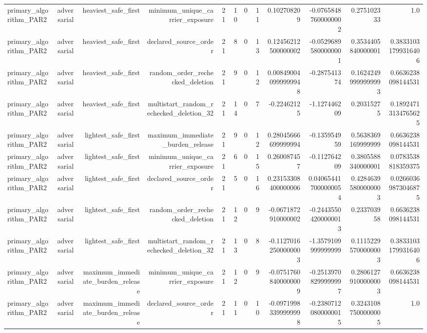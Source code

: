 {\begin{longtable}{lrrrrrrrrrrr}
primary\_algorithm\_PAR2 & adversarial & heaviest\_safe\_first & minimum\_unique\_carrier\_exposure & 21 & 10 & 0 & 11 & 0.102708209 & -0.07658487600000002 & 0.275102333 & 1.0 \\
primary\_algorithm\_PAR2 & adversarial & heaviest\_safe\_first & declared\_source\_order & 21 & 8 & 0 & 13 & 0.12456212500000002 & -0.05296895800000001 & 0.3534405840000001 & 0.38331031799316406 \\
primary\_algorithm\_PAR2 & adversarial & heaviest\_safe\_first & random\_order\_rechecked\_deletion & 21 & 9 & 0 & 12 & 0.008490040999999948 & -0.287541374 & 0.16242499999999993 & 0.6636238098144531 \\
primary\_algorithm\_PAR2 & adversarial & heaviest\_safe\_first & multistart\_random\_rechecked\_deletion\_32 & 21 & 14 & 0 & 7 & -0.22462125 & -1.127446209 & 0.20315275 & 0.18924713134765625 \\
primary\_algorithm\_PAR2 & adversarial & lightest\_safe\_first & maximum\_immediate\_burden\_release & 21 & 9 & 0 & 12 & 0.28045666699999994 & -0.135954959 & 0.5638369169999999 & 0.6636238098144531 \\
primary\_algorithm\_PAR2 & adversarial & lightest\_safe\_first & minimum\_unique\_carrier\_exposure & 21 & 6 & 0 & 15 & 0.260087457 & -0.112764209 & 0.3805588340000001 & 0.0783538818359375 \\
primary\_algorithm\_PAR2 & adversarial & lightest\_safe\_first & declared\_source\_order & 21 & 5 & 0 & 16 & 0.23153308400000006 & 0.040654417000000054 & 0.42846395800000003 & 0.02660369873046875 \\
primary\_algorithm\_PAR2 & adversarial & lightest\_safe\_first & random\_order\_rechecked\_deletion & 21 & 12 & 0 & 9 & -0.0671872910000002 & -0.24435504200000013 & 0.233703958 & 0.6636238098144531 \\
primary\_algorithm\_PAR2 & adversarial & lightest\_safe\_first & multistart\_random\_rechecked\_deletion\_32 & 21 & 13 & 0 & 8 & -0.11270162500000003 & -1.3579109999999999 & 0.11152295700000003 & 0.38331031799316406 \\
primary\_algorithm\_PAR2 & adversarial & maximum\_immediate\_burden\_release & minimum\_unique\_carrier\_exposure & 21 & 12 & 0 & 9 & -0.07517608400000009 & -0.25139708299999997 & 0.28061279100000003 & 0.6636238098144531 \\
primary\_algorithm\_PAR2 & adversarial & maximum\_immediate\_burden\_release & declared\_source\_order & 21 & 11 & 0 & 10 & -0.09719983399999998 & -0.23807120800000015 & 0.32431087500000005 & 1.0 \\

\end{longtable}}
